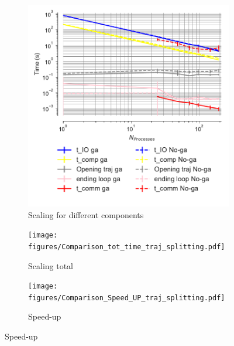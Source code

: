 \begin{figure}[!htb]
  \centering
  \begin{subfigure}{.32\textwidth}
    \includegraphics[width=\linewidth]{figures/Comparison_IO_compute_scaling_traj_splitting.pdf}
    \captionsetup{format=hang}
    \caption{Scaling for different components}
    \label{fig:ScalingComputeIO-split}
  \end{subfigure}
  \hfill
  \begin{subfigure}{.3\textwidth}
    \texttt{[image: figures/Comparison\_tot\_time\_traj\_splitting.pdf]}
    \caption{Scaling total}
    \label{fig:MPIscaling-split}
  \end{subfigure}
  \hfill
  \begin{subfigure}{.3\textwidth}
    \texttt{[image: figures/Comparison\_Speed\_UP\_traj\_splitting.pdf]}
    \captionsetup{format=hang}
    \caption{Speed-up}
    \label{fig:MPIspeedup-split}
  \end{subfigure}
  \bigskip


\end{figure}
